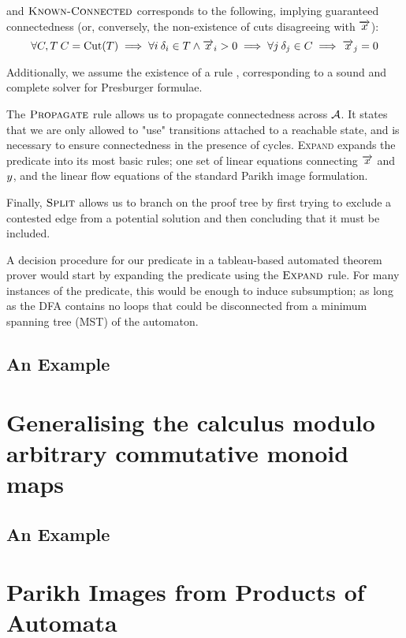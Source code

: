 \documentclass[runningheads]{llncs}
\begin{document}
and $\textsc{Known-Connected}$ corresponds to the following, implying guaranteed
connectedness (or, conversely, the non-existence of cuts disagreeing with $\overrightarrow{x}$):
$$
\forall{C, T}\: C = \operatorname{Cut}(T) \implies \forall{i} \: \delta_i \in T \land \overrightarrow{x}_i > 0 \implies \forall{j} \: \delta_j \in C \implies \overrightarrow{x}_j = 0
$$

Additionally, we assume the existence of a rule \PresburgerClose{},
corresponding to a sound and complete solver for Presburger formulae.

The $\textsc{Propagate}{}$ rule allows us to propagate connectedness across
$\mathcal{A}$. It states that we are only allowed to "use" transitions attached
to a reachable state, and is necessary to ensure connectedness in the presence
of cycles. \textsc{Expand} expands the predicate into its most basic rules; one
set of linear equations connecting $\overrightarrow{x}$ and $y$,
and the linear flow equations of the standard Parikh image formulation.

Finally, $\textsc{Split}{}$ allows us to branch on the proof tree by first trying to
exclude a contested edge from a potential solution and then concluding that it
must be included.

A decision procedure for our predicate in a tableau-based automated theorem
prover would start by expanding the predicate using the $\textsc{Expand}{}$ rule. For
many instances of the predicate, this would be enough to induce subsumption;
as long as the DFA contains no loops that could be disconnected from a minimum
spanning tree (MST) of the automaton.

\subsection{An Example}

\section{Generalising the calculus modulo arbitrary commutative monoid maps}


\subsection{An Example}

\section{Parikh Images from Products of Automata}
  
\end{document}
